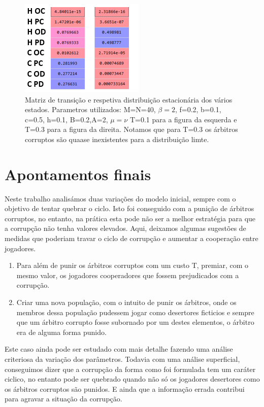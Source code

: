 \documentclass[conference, twocolumn]{IEEEtran}
\theoremstyle{plain}
\theoremstyle{definition}
\theoremstyle{remark}
\begin{document}
    \begin{figure}[h]
        \centering
        \includegraphics[width=0.5\linewidth]{images/T'S_FIN.PNG}
        \caption{\small Matriz de transição e respetiva distribuição estacionária dos vários estados. Parametros utilizados: M=N=40, $\beta=2$, f=0.2, b=0.1, c=0.5, h=0.1, B=0.2,A=2, $\mu=\nu$ T=0.1 para a figura da esquerda e T=0.3 para a figura da direita. Notamos que para T=0.3 os árbitros corruptos são quaase inexistentes para a distribuição limte. }
    \end{figure}

    \section{Apontamentos finais}
    Neste trabalho analisámos duas variações do modelo inicial, sempre com o objetivo de tentar quebrar o ciclo. Isto foi conseguido com a punição de árbitros corruptos, no entanto, na prática esta pode não ser a melhor estratégia para que a corrupção não tenha valores elevados. Aqui, deixamos algumas sugestões de medidas que poderiam travar o ciclo de corrupção e aumentar a cooperação entre jogadores.

    \begin{itemize}
        \begin{enumerate}
            \item  Para além de punir os árbitros corruptos com um custo T, premiar, com o mesmo valor, os jogadores cooperadores que fossem prejudicados com a corrupção.
            \item Criar uma nova população, com o intuito de punir os árbitros, onde os membros dessa população pudessem jogar como desertores ficticios e sempre que um árbitro corrupto fosse subornado por um destes elementos, o árbitro era de alguma forma punido.
        \end{enumerate}
    \end{itemize}

    Este caso ainda pode ser estudado com mais detalhe fazendo uma análise criteriosa da variação dos parâmetros. Todavia com uma análise superficial, conseguimos dizer que a corrupção da forma como foi formulada tem um caráter ciclico, no entanto pode ser quebrado quando não só os jogadores desertores como os árbitros corruptos são punidos. E ainda que a informação errada contribui para agravar a situação da corrupção.
\end{document}
